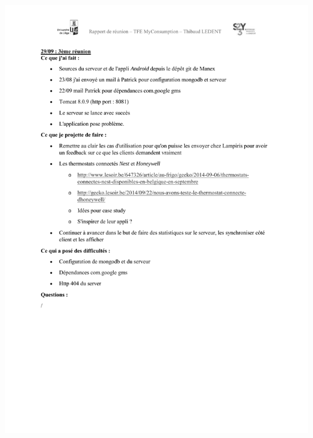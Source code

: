 \documentclass[a4paper, oneside, 11pt]{book}
\begin{document}
\includegraphics[width=1\textwidth]{reports_NB_Part3.pdf}
\newpage
\end{document}
